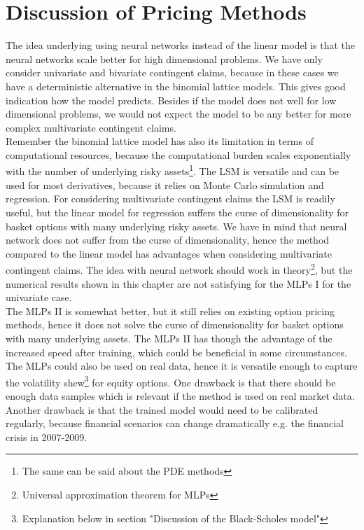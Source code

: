 \section{Discussion of Pricing Methods}
The idea underlying using neural networks instead of the linear model is that the neural networks scale better for high dimensional problems. We have only consider univariate and bivariate contingent claims, because in these cases we have a deterministic alternative in the binomial lattice models. This gives good indication how the model predicts. Besides if the model does not well for low dimensional problems, we would not expect the model to be any better for more complex multivariate contingent claims.\\

Remember the binomial lattice model has also its limitation in terms of computational resources, because the computational burden scales exponentially with the number of underlying risky assets\footnote{The same can be said about the PDE methods}. The LSM is versatile and can be used for most derivatives, because it relies on Monte Carlo simulation and regression. For considering multivariate contingent claims the LSM is readily useful, but the linear model for regression suffers the curse of dimensionality for basket options with many underlying risky assets. We have in mind that neural network does not suffer from the curse of dimensionality, hence the method compared to the linear model has advantages when considering multivariate contingent claims. The idea with neural network should work in theory\footnote{Universal approximation theorem for MLPs}, but the numerical results shown in this chapter are not satisfying for the MLPs I for the univariate case.\\

The MLPs II is somewhat better, but it still relies on existing option pricing methods, hence it does not solve the curse of dimensionality for basket options with many underlying assets. The MLPs II has though the advantage of the increased speed after training, which could be beneficial in some circumstances. The MLPs could also be used on real data, hence it is versatile enough to capture the volatility shew\footnote{Explanation below in section "Discussion of the Black-Scholes model"} for equity options. One drawback is that there should be enough data samples which is relevant if the method is used on real market data. Another drawback is that the trained model would need to be calibrated regularly, because financial scenarios can change dramatically e.g. the financial crisis in 2007-2009.\\

